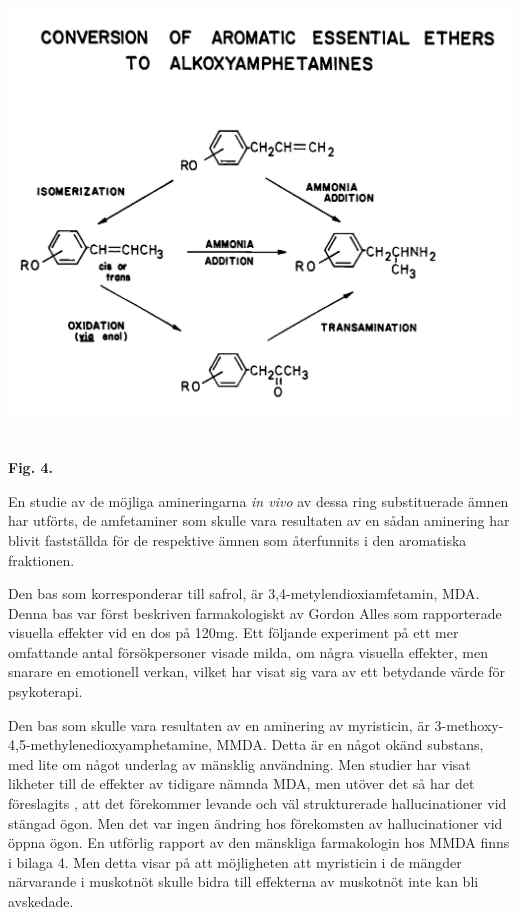 \documentclass{theme/franska}
\begin{document}
{	\hbox{\hspace{1cm}\includegraphics[scale=0.115]{Figure4}
	}
	\begin{center}\textbf{Fig. 4.}\end{center}


	En studie av de möjliga amineringarna \textit{in vivo} av dessa ring substituerade
	ämnen har utförts, de amfetaminer som skulle vara resultaten av en sådan
	aminering har blivit fastställda för de respektive ämnen som återfunnits
	i den aromatiska fraktionen.

	Den bas som korresponderar till safrol, är 3,4-metylendioxiamfetamin, MDA.
	Denna bas var först beskriven farmakologiskt av Gordon Alles \cite{alles1959some} som
	rapporterade visuella effekter vid en dos på 120mg. Ett följande experiment
	\cite{shulgin1967chemistry} på ett mer omfattande antal försökpersoner visade milda, om några
	visuella effekter, men snarare en emotionell verkan, vilket har visat sig
	vara av ett betydande värde för psykoterapi.

	Den bas som skulle vara resultaten av en aminering av myristicin, är
	3-methoxy-4,5-methylenedioxyamphetamine, MMDA.
	Detta är en något okänd substans, med lite om något underlag av mänsklig användning. Men studier har visat likheter till de effekter av tidigare nämnda MDA, men utöver det så har det föreslagits \cite{shulgin1995pihkal}, att det förekommer levande och väl strukturerade hallucinationer vid stängad ögon. Men det var ingen ändring hos förekomsten av hallucinationer vid öppna ögon. En utförlig rapport av den mänskliga farmakologin hos MMDA finns i bilaga 4.
	Men detta visar på att möjligheten att myristicin i de mängder närvarande i muskotnöt skulle bidra till effekterna av muskotnöt inte kan bli avskedade.

}
\end{document}
